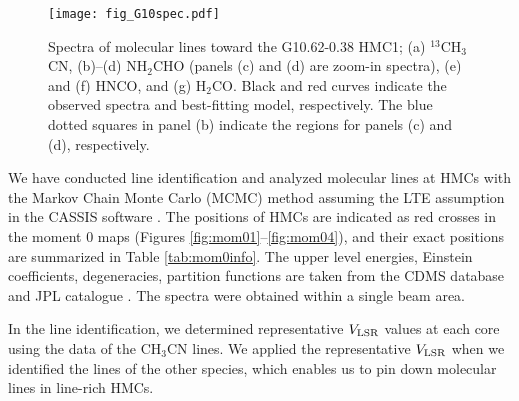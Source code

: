 \documentclass[twocolumn, twocolappendix]{aastex631}
\begin{document}
\begin{figure*}[!th]
 \begin{center}
  \texttt{[image: fig\_G10spec.pdf]}
 \end{center}
\caption{Spectra of molecular lines toward the G10.62-0.38 HMC1; (a) $^{13}$CH$_{3}$CN, (b)--(d) NH$_{2}$CHO (panels (c) and (d) are zoom-in spectra), (e) and (f) HNCO, and (g) H$_{2}$CO. Black and red curves indicate the observed spectra and best-fitting model, respectively. The blue dotted squares in panel (b) indicate the regions for panels (c) and (d), respectively. \label{fig:specG10}}
\end{figure*}

We have conducted line identification and analyzed molecular lines at HMCs with the Markov Chain Monte Carlo (MCMC) method assuming the LTE assumption in the CASSIS software \citep{2015sf2a.conf..313V}.
The positions of HMCs are indicated as red crosses in the moment 0 maps (Figures \ref{fig:mom01}--\ref{fig:mom04}), and their exact positions are summarized in Table \ref{tab:mom0info}.
The upper level energies, Einstein coefficients, degeneracies, partition functions are taken from the CDMS database \citep[for $^{13}$CH$_{3}$CN and CH$_{3}$CN;][]{2016JMoSp.327...95E} and JPL catalogue \citep[for NH$_{2}$CHO, HNCO, H$_{2}$CO;][]{1998JQSRT..60..883P}.
The spectra were obtained within a single beam area. %

In the line identification, we determined representative $V_{\rm {LSR}}$ values at each core using the data of the CH$_{3}$CN lines.
We applied the representative $V_{\rm {LSR}}$ when we identified the lines of the other species, which enables us to pin down molecular lines in line-rich HMCs.
\end{document}
